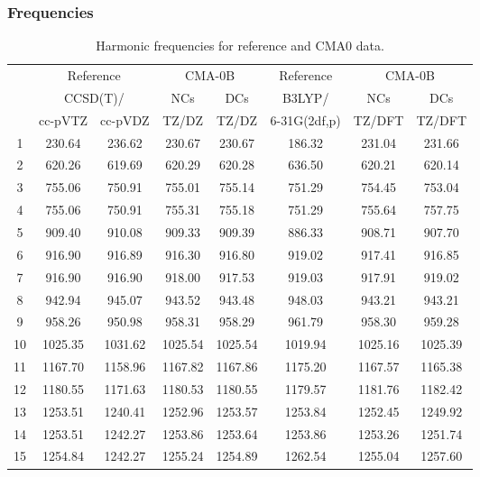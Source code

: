 \documentclass[10pt,oneside]{article}
\begin{document}
\clearpage

\subsubsection*{Frequencies}
\begin{table}[h!]
\centering
\caption{Harmonic frequencies for reference and CMA0 data.}
\begin{tabular}{cccccccc}
\toprule
{} & \multicolumn{2}{c}{Reference} & \multicolumn{2}{c}{CMA-0B} &    Reference & \multicolumn{2}{c}{CMA-0B} \\
{} & \multicolumn{2}{c}{CCSD(T)/} &     NCs &     DCs &       B3LYP/ &     NCs &     DCs \\
{} &   cc-pVTZ & cc-pVDZ &   TZ/DZ &   TZ/DZ & 6-31G(2df,p) &  TZ/DFT &  TZ/DFT \\
\midrule
1  &    230.64 &  236.62 &  230.67 &  230.67 &       186.32 &  231.04 &  231.66 \\
2  &    620.26 &  619.69 &  620.29 &  620.28 &       636.50 &  620.21 &  620.14 \\
3  &    755.06 &  750.91 &  755.01 &  755.14 &       751.29 &  754.45 &  753.04 \\
4  &    755.06 &  750.91 &  755.31 &  755.18 &       751.29 &  755.64 &  757.75 \\
5  &    909.40 &  910.08 &  909.33 &  909.39 &       886.33 &  908.71 &  907.70 \\
6  &    916.90 &  916.89 &  916.30 &  916.80 &       919.02 &  917.41 &  916.85 \\
7  &    916.90 &  916.90 &  918.00 &  917.53 &       919.03 &  917.91 &  919.02 \\
8  &    942.94 &  945.07 &  943.52 &  943.48 &       948.03 &  943.21 &  943.21 \\
9  &    958.26 &  950.98 &  958.31 &  958.29 &       961.79 &  958.30 &  959.28 \\
10 &   1025.35 & 1031.62 & 1025.54 & 1025.54 &      1019.94 & 1025.16 & 1025.39 \\
11 &   1167.70 & 1158.96 & 1167.82 & 1167.86 &      1175.20 & 1167.57 & 1165.38 \\
12 &   1180.55 & 1171.63 & 1180.53 & 1180.55 &      1179.57 & 1181.76 & 1182.42 \\
13 &   1253.51 & 1240.41 & 1252.96 & 1253.57 &      1253.84 & 1252.45 & 1249.92 \\
14 &   1253.51 & 1242.27 & 1253.86 & 1253.64 &      1253.86 & 1253.26 & 1251.74 \\
15 &   1254.84 & 1242.27 & 1255.24 & 1254.89 &      1262.54 & 1255.04 & 1257.60 \\

\end{tabular}
\end{table}
\end{document}

